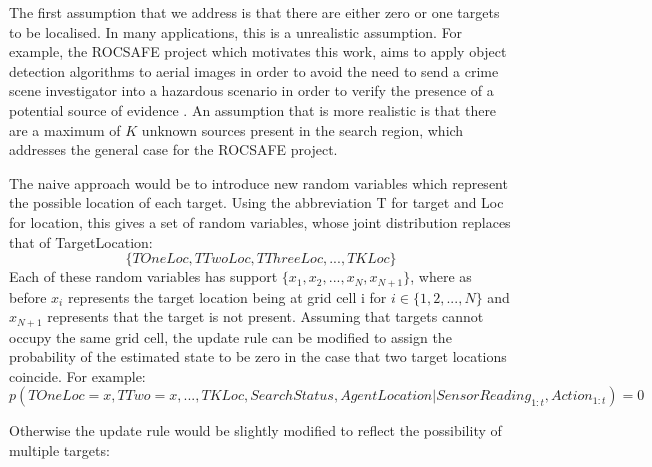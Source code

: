 The first assumption that we address is that there are either zero or one targets to be localised. In many applications, this is a unrealistic assumption. For example, the ROCSAFE project which motivates this work, aims to apply object detection algorithms to aerial images in order to avoid the need to send a crime scene investigator into a hazardous scenario in order to verify the presence of a potential source of evidence \cite{Bagherzadeh2017ROCSAFE:Incidents}. An assumption that is more realistic is that there are a maximum of $K$ unknown sources present in the search region, which addresses the general case for the ROCSAFE  project.\par

The naive approach would be to introduce new random variables which represent the possible location of each target. Using the abbreviation T for target and Loc for location, this gives a set of random variables, whose joint distribution replaces that of TargetLocation: \[\{TOneLoc, TTwoLoc, TThreeLoc,...,TKLoc\}\] Each of these random variables has support $\{x_1, x_2, ..., x_N, x_{N+1}\}$, where as before $x_i$ represents the target location being at grid cell i for $i \in \{1,2, ..., N\}$ and $x_{N+1}$ represents that the target is not present. 
Assuming that targets cannot occupy the same grid cell, the update rule can be modified to assign the probability of the estimated state to be zero in the case that two target locations coincide. For example:
\footnotesize{
\[p(TOneLoc = x, TTwo = x, ..., TKLoc, SearchStatus, AgentLocation | SensorReading_{1:t}, Action_{1:t}) = 0\]}

\normalsize
Otherwise the update rule would be slightly modified to reflect the possibility of multiple targets: 


\scriptsize

